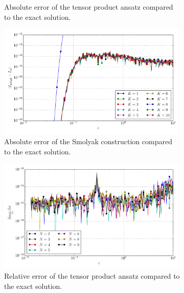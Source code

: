 \documentclass[a4paper,10pt]{article}
\begin{document}
\begin{figure}[ht!]
\begin{subfigure}[t]{0.5\linewidth}
    \caption{Absolute error of the tensor product ansatz compared to the exact solution.}
    \label{fig:tp_sg_3d_conv_eps_110_011_err_nsd_tp}
  \end{subfigure}
  \begin{subfigure}[t]{0.5\linewidth}
    \includegraphics[width=\linewidth]{./plots/tp_sg_3d_conv_eps_(1,1,0)_(0,1,1)_err_nsd_gk.pdf}
    \caption{Absolute error of the Smolyak construction compared to the exact solution.}
    \label{fig:tp_sg_3d_conv_eps_110_011_err_nsd_gk}
  \end{subfigure}
  \begin{subfigure}[t]{0.5\linewidth}
    \includegraphics[width=\linewidth]{./plots/tp_sg_3d_conv_eps_(1,1,0)_(0,1,1)_err_rel_nsd_tp.pdf}
    \caption{Relative error of the tensor product ansatz compared to the exact solution.}
    \label{fig:tp_sg_3d_conv_eps_110_011_err_rel_nsd_tp}
  \end{subfigure}
  \begin{subfigure}[t]{0.5\linewidth}

\end{subfigure}
\end{figure}
\end{document}
